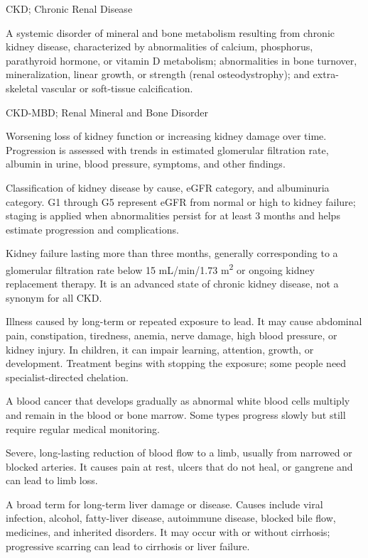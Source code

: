 \synonyms
CKD; Chronic Renal Disease


 A systemic disorder of mineral and bone metabolism resulting from chronic kidney disease, characterized by abnormalities of calcium, phosphorus, parathyroid hormone, or vitamin D metabolism; abnormalities in bone turnover, mineralization, linear growth, or strength (renal osteodystrophy); and extra-skeletal vascular or soft-tissue calcification.

\synonyms
CKD-MBD; Renal Mineral and Bone Disorder

 Worsening loss of kidney function or increasing kidney damage over time. Progression is assessed with trends in estimated glomerular filtration rate, albumin in urine, blood pressure, symptoms, and other findings.

 Classification of kidney disease by cause, eGFR category, and albuminuria category. G1
through G5 represent eGFR from normal or high to kidney failure; staging is applied when
abnormalities persist for at least 3 months and helps estimate progression and
complications.

 Kidney failure lasting more than three
months, generally corresponding to a glomerular filtration rate below
15 mL/min/1.73 m\textsuperscript{2} or ongoing kidney replacement therapy.
It is an advanced state of chronic kidney disease, not a synonym for all CKD.

 Illness caused by long-term or repeated exposure to lead. It may cause abdominal pain, constipation, tiredness, anemia, nerve damage, high blood pressure, or kidney injury. In children, it can impair learning, attention, growth, or development. Treatment begins with stopping the exposure; some people need specialist-directed chelation.

 A blood cancer that develops gradually as abnormal white blood cells multiply and remain in the blood or bone marrow. Some types progress slowly but still require regular medical monitoring.

 Severe, long-lasting reduction of blood flow to a limb, usually from narrowed or blocked arteries. It causes pain at rest, ulcers that do not heal, or gangrene and can lead to limb loss.

 A broad term for long-term liver damage or disease. Causes include viral infection, alcohol, fatty-liver disease, autoimmune disease, blocked bile flow, medicines, and inherited disorders. It may occur with or without cirrhosis; progressive scarring can lead to cirrhosis or liver failure.

